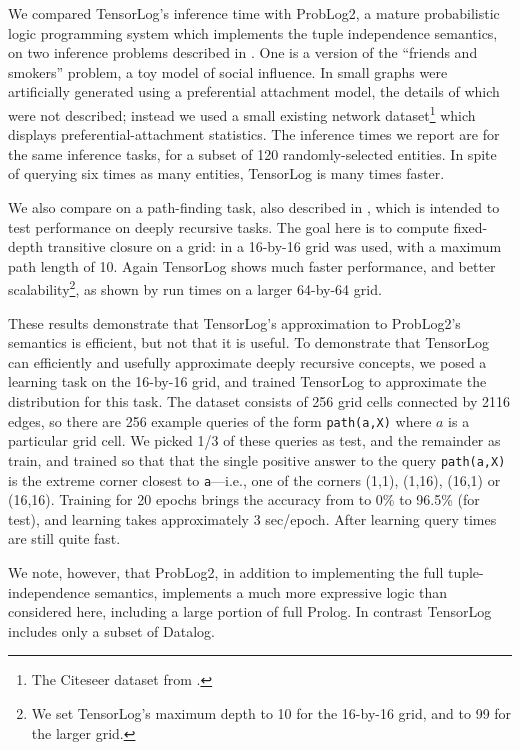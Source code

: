 \documentclass{article}
\newcommand{\cd}[1]{{\small \texttt{#1}}}
\begin{document}
We compared TensorLog's inference time with ProbLog2, a mature
probabilistic logic programming system which implements the tuple
independence semantics, on two inference problems described in
\cite{fierens2016}.  One is a version of the ``friends and smokers''
problem, a toy model of social influence.  In \cite{fierens2016} small
graphs were artificially generated using a preferential attachment
model, the details of which were not described; instead we used a
small existing network dataset\footnote{The Citeseer dataset from
  \cite{DBLP:conf/asunam/LinC10}.} which displays
preferential-attachment statistics.  The inference times we report are
for the same inference tasks, for a subset of 120 randomly-selected
entities.  In spite of querying six times as many entities, TensorLog
is many times faster.  

We also compare on a path-finding task, also described in
\cite{fierens2016}, which is intended to test performance on deeply
recursive tasks.  The goal here is to compute fixed-depth transitive
closure on a grid: in \cite{fierens2016} a 16-by-16 grid was used,
with a maximum path length of 10.  Again TensorLog shows much faster
performance, and better scalability\footnote{We set TensorLog's
  maximum depth to 10 for the 16-by-16 grid, and to 99 for the larger
  grid.}, as shown by run times on a larger 64-by-64 grid.

These results demonstrate that TensorLog's approximation to ProbLog2's
semantics is efficient, but not that it is useful.  To demonstrate
that TensorLog can efficiently and usefully approximate deeply
recursive concepts, we posed a learning task on the 16-by-16 grid, and
trained TensorLog to approximate the distribution for this task.  The
dataset consists of 256 grid cells connected by 2116 edges, so there
are 256 example queries of the form \cd{path(a,X)} where $a$ is a
particular grid cell.  We picked 1/3 of these queries as test, and the
remainder as train, and trained so that that the single positive
answer to the query \cd{path(a,X)} is the extreme corner closest to
\cd{a}---i.e., one of the corners (1,1), (1,16), (16,1) or (16,16).
Training for 20 epochs brings the accuracy from to 0\% to 96.5\% (for
test), and learning takes approximately 3 sec/epoch.  After learning
query times are still quite fast.  

We note, however, that ProbLog2, in addition to implementing the full
tuple-independence semantics, implements a much more expressive logic
than considered here, including a large portion of full Prolog. In
contrast TensorLog includes only a subset of Datalog.
\end{document}
